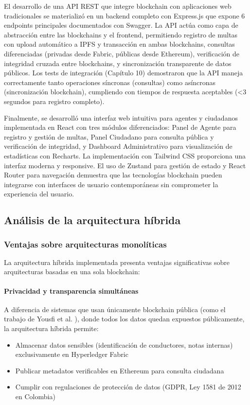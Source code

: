 El desarrollo de una API REST que integre blockchain con aplicaciones web tradicionales se materializó en un backend completo con Express.js que expone 6 endpoints principales documentados con Swagger. La API actúa como capa de abstracción entre las blockchains y el frontend, permitiendo registro de multas con upload automático a IPFS y transacción en ambas blockchains, consultas diferenciadas (privadas desde Fabric, públicas desde Ethereum), verificación de integridad cruzada entre blockchains, y sincronización transparente de datos públicos. Los tests de integración (Capítulo 10) demostraron que la API maneja correctamente tanto operaciones síncronas (consultas) como asíncronas (sincronización blockchain), cumpliendo con tiempos de respuesta aceptables (<3 segundos para registro completo).

Finalmente, se desarrolló una interfaz web intuitiva para agentes y ciudadanos implementada en React con tres módulos diferenciados: Panel de Agente para registro y gestión de multas, Panel Ciudadano para consulta pública y verificación de integridad, y Dashboard Administrativo para visualización de estadísticas con Recharts. La implementación con Tailwind CSS proporciona una interfaz moderna y responsive. El uso de Zustand para gestión de estado y React Router para navegación demuestra que las tecnologías blockchain pueden integrarse con interfaces de usuario contemporáneas sin comprometer la experiencia del usuario.

\subsection{Análisis de la arquitectura híbrida}

\subsubsection{Ventajas sobre arquitecturas monolíticas}

La arquitectura híbrida implementada presenta ventajas significativas sobre arquitecturas basadas en una sola blockchain:

\paragraph{Privacidad y transparencia simultáneas}
A diferencia de sistemas que usan únicamente blockchain pública (como el trabajo de Yousfi et al. \parencite{yousfi2019blockchain}), donde todos los datos quedan expuestos públicamente, la arquitectura híbrida permite:
\begin{itemize}
    \item Almacenar datos sensibles (identificación de conductores, notas internas) exclusivamente en Hyperledger Fabric
    \item Publicar metadatos verificables en Ethereum para consulta ciudadana
    \item Cumplir con regulaciones de protección de datos (GDPR, Ley 1581 de 2012 en Colombia)
\end{itemize}

